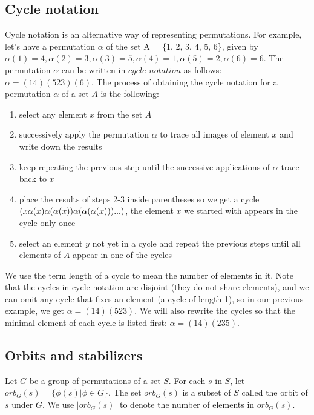 \subsection{Cycle notation}
\label{sec:cycle_notation}

Cycle notation is an alternative way of representing permutations. For example, let's have a permutation $\alpha$ of the set A = \{1, 2, 3, 4, 5, 6\}, given by $\alpha(1) = 4, \alpha(2) = 3, \alpha(3) = 5, \alpha(4) = 1, \alpha(5) = 2, \alpha(6) = 6$. The permutation $\alpha$ can be written in $cycle$ $notation$ as follows: $\alpha = (14)(523)(6)$. The process of obtaining the cycle notation for a permutation $\alpha$ of a set $A$ is the following:

\begin{enumerate}
\item select any element $x$ from the set $A$
\item successively apply the permutation $\alpha$ to trace all images of element $x$ and write down the results
\item keep repeating the previous step until the successive applications of $\alpha$ trace back to $x$
\item place the results of steps 2-3 inside parentheses so we get a cycle $(x \alpha(x) \\ \alpha(\alpha(x)) \alpha(\alpha(\alpha(x))) ...)$, the element $x$ we started with appears in the cycle only once
\item select an element $y$ not yet in a cycle and repeat the previous steps until all elements of $A$ appear in one of the cycles
\end{enumerate}

We use the term length of a cycle to mean the number of elements in it. Note that the cycles in cycle notation are disjoint (they do not share elements), and we can omit any cycle that fixes an element (a cycle of length 1), so in our previous example, we get $\alpha = (14)(523)$. We will also rewrite the cycles so that the minimal element of each cycle is listed first: $\alpha = (14)(235)$.

\subsection{Orbits and stabilizers}

\begin{definition}
Let $G$ be a group of permutations of a set $S$. For each $s$ in $S$, let $orb_G(s) = \{\phi(s) | \phi \in G \}$. The set $orb_G(s)$ is a subset of $S$ called the orbit of $s$ under $G$. We use $|orb_G(s)|$ to denote the number of elements in $orb_G(s)$.
\end{definition}

